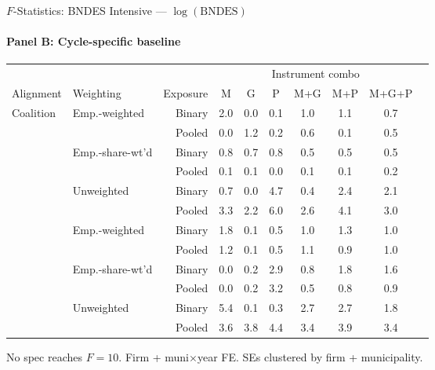 \documentclass[aspectratio=169,10pt]{beamer}
\begin{document}
\begin{frame}[t]{$F$-Statistics: BNDES Intensive --- $\log(\text{BNDES})$}
\framesubtitle{Panel B: Cycle-specific baseline}
\begin{center}
\footnotesize
\setlength{\tabcolsep}{3.5pt}
\renewcommand{\arraystretch}{1.05}
\begin{tabular}{@{}llrccccccc@{}}
\toprule
 & & & \multicolumn{6}{c}{Instrument combo} \\
\cmidrule(l{2pt}r{2pt}){4-9}
Alignment & Weighting & Exposure & M & G & P & M+G & M+P & M+G+P \\
\midrule
  \multirow{6}{*}{Coalition} & \multirow{2}{*}{Emp.-weighted} & Binary & 2.0 & 0.0 & 0.1 & 1.0 & 1.1 & 0.7 \\
   &  & Pooled & 0.0 & 1.2 & 0.2 & 0.6 & 0.1 & 0.5 \\
   & \multirow{2}{*}{Emp.-share-wt'd} & Binary & 0.8 & 0.7 & 0.8 & 0.5 & 0.5 & 0.5 \\
   &  & Pooled & 0.1 & 0.1 & 0.0 & 0.1 & 0.1 & 0.2 \\
   & \multirow{2}{*}{Unweighted} & Binary & 0.7 & 0.0 & 4.7 & 0.4 & 2.4 & 2.1 \\
   &  & Pooled & 3.3 & 2.2 & 6.0 & 2.6 & 4.1 & 3.0 \\
\addlinespace[5pt]
  \multirow{6}{*}{Party} & \multirow{2}{*}{Emp.-weighted} & Binary & 1.8 & 0.1 & 0.5 & 1.0 & 1.3 & 1.0 \\
   &  & Pooled & 1.2 & 0.1 & 0.5 & 1.1 & 0.9 & 1.0 \\
   & \multirow{2}{*}{Emp.-share-wt'd} & Binary & 0.0 & 0.2 & 2.9 & 0.8 & 1.8 & 1.6 \\
   &  & Pooled & 0.0 & 0.2 & 3.2 & 0.5 & 0.8 & 0.9 \\
   & \multirow{2}{*}{Unweighted} & Binary & 5.4 & 0.1 & 0.3 & 2.7 & 2.7 & 1.8 \\
   &  & Pooled & 3.6 & 3.8 & 4.4 & 3.4 & 3.9 & 3.4 \\
\bottomrule
\end{tabular}
\end{center}
{\scriptsize No spec reaches $F=10$. Firm + muni$\times$year FE. SEs clustered by firm + municipality.}
\end{frame}
\end{document}

